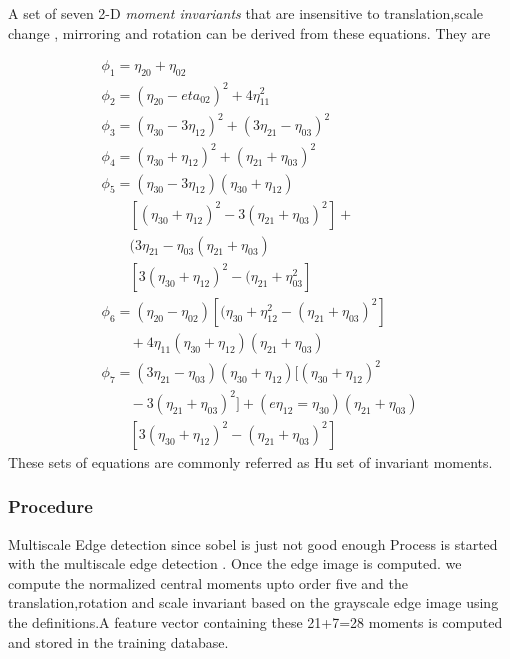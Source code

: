 \par
A set of seven 2-D \emph{moment invariants} that are insensitive to translation,scale change , mirroring and rotation can be derived from these equations. They are

\begin{align}
&\phi_{1}=\eta_{20} + \eta_{02} \\
&\phi_{2}=(\eta_{20} -eta_{02})^2 + 4\eta_{11}^2   \\
&\phi_{3}=(\eta_{30} -3\eta_{12})^2 + (3\eta_{21}-\eta_{03})^2  \\ 
&\phi_{4}=(\eta_{30} + \eta_{12})^2 + (\eta_{21} + \eta_{03})^2  &\\
&\phi_{5}=(\eta_{30}-3\eta_{12})(\eta_{30} + \eta_{12})  \nonumber \\
		 &\qquad [(\eta_{30}+\eta_{12})^2  - 3(\eta_{21} + \eta_{03})^2 ] + \nonumber \\
		& \qquad(3\eta_{21}-\eta_{03}  (\eta_{21}+\eta_{03}) \nonumber \\		
		&\qquad[3(\eta_{30}+\eta_{12})^2 - (\eta_{21}+\eta_{03}^2]  \\
&\phi_{6}=(\eta_{20}-\eta_{02})[(\eta_{30}+\eta_{12}^2 -(\eta_{21}+\eta_{03})^2] \nonumber\\
	&\qquad+ 4\eta_{11}(\eta_{30}+\eta_{12})(\eta_21 + \eta_{03})  \\
&\phi_{7}=(3\eta_{21} -\eta_{03})(\eta_{30}+\eta_{12})[ (\eta_{30} + \eta_{12})^2 \nonumber \\
		&\qquad-3(\eta_{21}+ \eta_{03})^2] + (e\eta_{12}=\eta_{30})(\eta_{21}+\eta_{03})\nonumber \\
		&\qquad[3(\eta_{30}+\eta_{12})^2 - (\eta_{21} + \eta_{03})^2]
\end{align}
These sets of equations are commonly referred as Hu set of invariant moments.\cite{hu62}

\subsubsection {Procedure}
Multiscale Edge detection since sobel is just not good enough
Process is started with the multiscale edge detection . Once the edge image is computed. we compute the normalized central moments upto order five and the translation,rotation and scale invariant based on the grayscale edge image using the definitions.A feature vector containing these 21+7=28 moments is computed and stored in the training database.\cite{Wang97}

